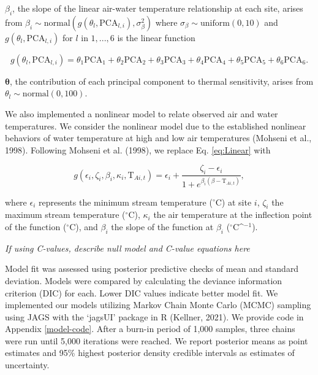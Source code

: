 \documentclass[
  11pt,
]{article}
\begin{document}
\(\beta_i\), the slope of the linear air-water temperature relationship at each site, arises from \(\beta_i \sim \text{normal}(g(\theta_l, \text{PCA}_{l,i}), \sigma^2_\beta)\) where \(\sigma_\beta \sim \text{uniform}(0,10)\) and \(g(\theta_l, \text{PCA}_{l,i})\) for \(l\) in \(1,...,6\) is the linear function

\begin{equation}
  g(\theta_l, \text{PCA}_{l,i}) = \theta_1\text{PCA}_1 + \theta_2\text{PCA}_2 + \theta_3\text{PCA}_3 + \theta_4\text{PCA}_4 + \theta_5\text{PCA}_5 + \theta_6\text{PCA}_6.
  \label{eq:PCALinear}
\end{equation}

\(\bm{\theta}\), the contribution of each principal component to thermal sensitivity, arises from \(\theta_l \sim \text{normal}(0, 100)\).

We also implemented a nonlinear model to relate observed air and water temperatures. We consider the nonlinear model due to the established nonlinear behaviors of water temperature at high and low air temperatures (Mohseni et al., 1998). Following Mohseni et al. (1998), we replace Eq. \eqref{eq:Linear} with

\begin{equation}
  g(\epsilon_i, \zeta_i, \beta_i, \kappa_i, \text{T}_{Ai,t}) = \epsilon_i + \frac{\zeta_i - \epsilon_i}{1 + e^{\beta_i(\beta - \text{T}_{Ai,t})}},
  \label{eq:MohseniModel}
\end{equation}

where \(\epsilon_i\) represents the minimum stream temperature (\(^\circ\)C) at site \(i\), \(\zeta_i\) the maximum stream temperature (\(^\circ\)C), \(\kappa_i\) the air temperature at the inflection point of the function (\(^\circ\)C), and \(\beta_i\) the slope of the function at \(\beta_i\) (\(^\circ\)C\^{}\(^{-1}\)).

\emph{If using C-values, describe null model and C-value equations here}

Model fit was assessed using posterior predictive checks of mean and standard deviation. Models were compared by calculating the deviance information criterion (DIC) for each. Lower DIC values indicate better model fit. We implemented our models utilizing Markov Chain Monte Carlo (MCMC) sampling using JAGS with the `jagsUI' package in R (Kellner, 2021). We provide code in Appendix \ref{model-code}. After a burn-in period of 1,000 samples, three chains were run until 5,000 iterations were reached. We report posterior means as point estimates and 95\% highest posterior density credible intervals as estimates of uncertainty.
\end{document}

